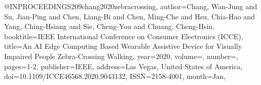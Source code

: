 @INPROCEEDINGS{209chang2020zebracrossing,
author={Chang, Wan-Jung and Su, Jian-Ping and Chen, Liang-Bi and Chen, Ming-Che and Hsu, Chia-Hao and Yang, Ching-Hsiang and Sie, Cheng-You and Chuang, Cheng-Hsin},
booktitle={IEEE International Conference on Consumer Electronics (ICCE)}, 
title={An AI Edge Computing Based Wearable Assistive Device for Visually Impaired People Zebra-Crossing Walking}, 
year={2020},
volume={},
number={},
pages={1-2},
publisher={IEEE},
address={Las Vegas, United States of America},
doi={10.1109/ICCE46568.2020.9043132},
ISSN={2158-4001},
month={Jan},}